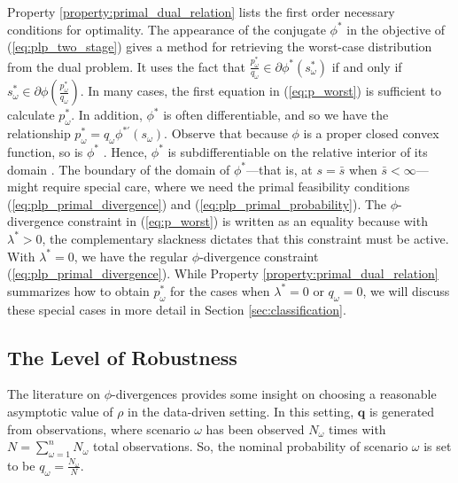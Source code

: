 \documentclass[opre,nonblindrev]{informs3} %
\newcommand{\q}{\mathbf{q}}
\begin{document}
Property \ref{property:primal_dual_relation} lists the first order necessary conditions for optimality. 
The appearance of the conjugate $\phi^*$ in the objective of (\ref{eq:plp_two_stage}) gives a method for retrieving the worst-case distribution from the dual problem.
It uses the fact that $\frac{p^*_\omega}{q_\omega} \in \partial \phi^*(s^*_\omega)$ if and only if $s^*_\omega \in \partial \phi\left(\frac{p^*_\omega}{q_\omega}\right)$.
In many cases, the first equation in (\ref{eq:p_worst}) is sufficient to calculate $p_\omega^*$.
In addition, $\phi^*$ is often differentiable, and so we have the relationship $p_\omega^* = q_\omega \phi^{* \prime}(s_\omega)$. 
Observe that because  $\phi$ is a proper closed convex function, so is $\phi^*$ \citep[Theorem 12.2]{rockafellar_70}.
Hence,  $\phi^*$ is subdifferentiable on the relative interior of its domain \citep[Theorem 23.4]{rockafellar_70}.  
The boundary of the domain of $\phi^*$---that is, at $s=\bar{s}$ when $\bar{s}<\infty$---might require special care, where we need the primal feasibility conditions (\ref{eq:plp_primal_divergence}) and (\ref{eq:plp_primal_probability}). 
The $\phi$-divergence constraint in (\ref{eq:p_worst}) is written as an equality because with $\lambda^*>0$, the complementary slackness dictates that this constraint must be active. 
With $\lambda^*=0$, we have the regular $\phi$-divergence constraint (\ref{eq:plp_primal_divergence}). 
While Property \ref{property:primal_dual_relation} summarizes how to obtain $p^*_\omega$ for the cases when $\lambda^* = 0$ or $q_\omega = 0$, we will discuss these special cases in more detail in Section \ref{sec:classification}.


\subsection{The Level of Robustness}
\label{ssec:robust_level}

The literature on $\phi$-divergences provides some insight on choosing a reasonable asymptotic value of $\rho$ in the data-driven setting. 
In this setting, $\q$ is generated from observations, where scenario $\omega$ has been observed $N_\omega$ times with $N = \sum_{\omega=1}^n N_\omega$ total observations.
So, the nominal probability of scenario $\omega$ is set to be $q_\omega = \frac{N_\omega}{N}$.
\end{document}
